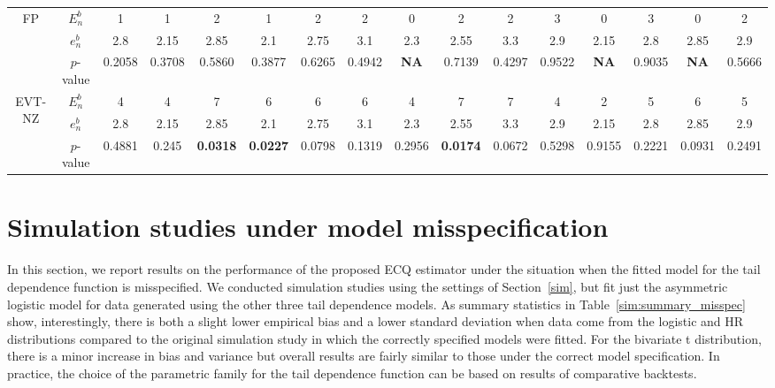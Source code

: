 \begin{landscape}
\begin{table}[H]
\begin{tabular}{cc|cccccccccccccc}
\multirow{3}{*}{FP}     & $E_n^b$   & 1      & 1      & 2               & 1               & 2      & 2      & 0           & 2      & 2               & 3      & 0      & 3      & 0      & 2      \\
                        & $e_n^b$   & 2.8    & 2.15   & 2.85            & 2.1             & 2.75   & 3.1    & 2.3         & 2.55   & 3.3             & 2.9    & 2.15   & 2.8    & 2.85   & 2.9    \\
                        & $p$-value & 0.2058  & 0.3708 & 0.5860          & 0.3877  & 0.6265 & 0.4942  & \textbf{NA}      & 0.7139 & 0.4297  & 0.9522 & \textbf{NA} & 0.9035 & \textbf{NA}  & 0.5666 \\ \hline
\multirow{3}{*}{EVT-NZ} & $E_n^b$   & 4      & 4      & 7               & 6               & 6      & 6      & 4           & 7      & 7               & 4      & 2      & 5      & 6      & 5      \\
                        & $e_n^b$   & 2.8    & 2.15   & 2.85            & 2.1             & 2.75   & 3.1    & 2.3         & 2.55   & 3.3             & 2.9    & 2.15   & 2.8    & 2.85   & 2.9    \\
                        & $p$-value & 0.4881 & 0.245  & \textbf{0.0318} & \textbf{0.0227} & 0.0798 & 0.1319 & 0.2956      & \textbf{0.0174} & 0.0672          & 0.5298 & 0.9155 & 0.2221 & 0.0931 & 0.2491 \\ \hline
\end{tabular}
\label{uncon_test}
\end{table}
\end{landscape}

\clearpage

\section{Simulation studies under model misspecification}\label{sup:Sim_Model_Misspecification}

In this section, we report results on the performance of the proposed ECQ estimator under the situation when the fitted model for the tail dependence function is misspecified. We conducted simulation studies using the settings of Section~\ref{sim}, but fit just the asymmetric logistic model for data generated using the other three tail dependence models. As summary statistics in Table~\ref{sim:summary_misspec} show, interestingly, there is both a slight lower empirical bias and a lower standard deviation when data come from the logistic and HR distributions compared to the original simulation study in which the correctly specified models were fitted. For the bivariate t distribution, there is a minor increase in bias and variance but overall results are fairly similar to those under the correct model specification. In practice, the choice of the parametric family for the tail dependence function can be based on results of comparative backtests.



